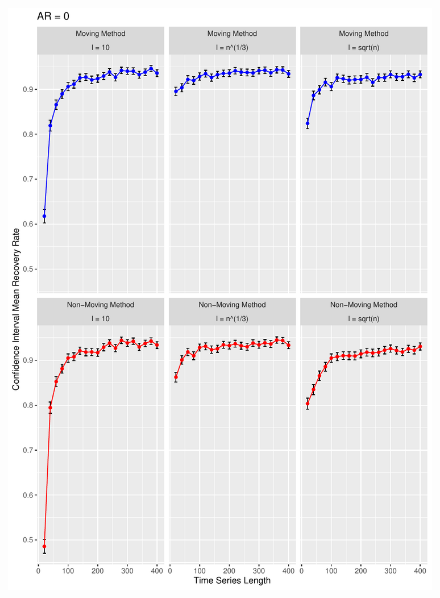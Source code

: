 \documentclass[12pt, letterpaper, titlepage]{article}
\begin{document}
\begin{figure}[p]
  \centering
  \includegraphics[width=\textwidth]{norm}
  \caption{}
  \label{fig:norm}
\end{figure}
\end{document}
